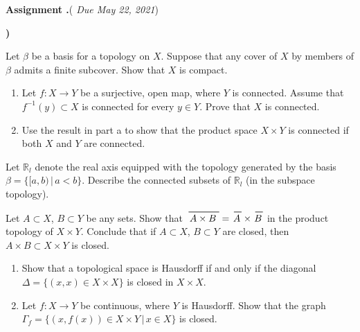\documentclass[12pt,reqno]{amsart}
\newcounter{assign}
\newenvironment{assignment}{\par\noindent\textbf{Assignment \Roman{assign}.\hskip2pt}}{\par\vskip12pt\stepcounter{assign}}
\theoremstyle{plain}
\theoremstyle{definition}
\newcommand{\R}[1]{\mathbb{R}^{#1}}
\newcommand\closure[2]{\overset{\raisebox{0.6pt}{\hspace{0.2em}\text{\rule{#1}{0.2mm}}}}{#2}}
\begin{document}
\begin{assignment}({\em{\color{duecolor} Due May 22, 2021}})
\begin{list}{\textbf{)}}{\setlength{\itemsep}{2pt}\setlength{\leftmargin}{15pt}\setlength{\parsep}{0pt}}
\item Let $\beta$ be a basis for a topology on $X$. Suppose that any cover of $X$ by members of $\beta$ admits a finite subcover. Show that $X$ is compact.
\item 
\begin{enumerate}[label=\textbf{\alph*}),itemindent=0cm]
\item
Let $f\colon X\to Y$ be a surjective, open map, where $Y$ is connected. Assume that $f^{-1}(y)\subset X$ is connected for every $y\in Y$. Prove that $X$ is connected.
\item Use the result in part a to show that the product space $X\times Y$ is connected if both $X$ and $Y$ are connected.
\end{enumerate}
\item Let $\R{}_l$ denote the real axis equipped with the topology generated by the basis $\beta=\{[a,b)\,\vert\,a<b\}$. Describe the connected subsets of $\R{}_l$ (in the subspace topology).
\item Let $A\subset X$, $B\subset Y$ be any sets. Show that $\closure{32pt}{A\times B}=\closure{8pt}{A}\times\closure{8pt}{B}$ in the product topology of $X\times Y$. Conclude that if $A\subset X$, $B\subset Y$ are closed, then $A\times B\subset X\times Y$ is closed.
\item
\begin{enumerate}[label=\textbf{\alph*})]
\item Show that a topological space is Hausdorff if and only if the diagonal $\Delta=\{(x,x)\in X\times X\}$ is closed in $X\times X$.
\item Let $f\colon X\to Y$ be continuous, where $Y$ is Hausdorff. Show that the graph $\Gamma_f=\{(x,f(x))\in X\times Y\,\vert\,x\in X\}$ is closed.
\end{enumerate}
\end{list}
\end{assignment}
\end{document}

